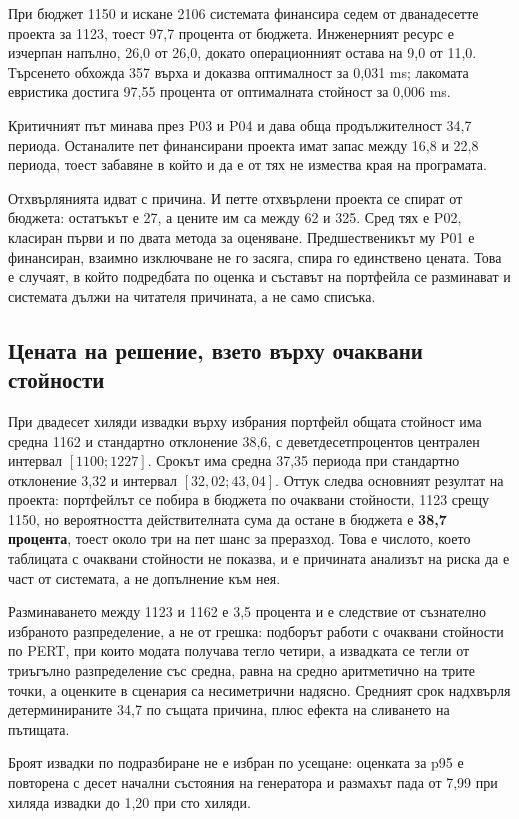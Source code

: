 При бюджет 1150 и искане 2106 системата финансира седем от дванадесетте проекта
за 1123, тоест 97,7 процента от бюджета. Инженерният ресурс е изчерпан напълно,
26,0 от 26,0, докато операционният остава на 9,0 от 11,0. Търсенето обхожда 357
върха и доказва оптималност за 0,031 ms; лакомата евристика достига 97,55 процента
от оптималната стойност за 0,006 ms.

Критичният път минава през P03 и P04 и дава обща продължителност 34,7 периода.
Останалите пет финансирани проекта имат запас между 16,8 и 22,8 периода, тоест
забавяне в който и да е от тях не измества края на програмата.

Отхвърлянията идват с причина. И петте отхвърлени проекта се спират от бюджета:
остатъкът е 27, а цените им са между 62 и 325. Сред тях е P02, класиран първи и
по двата метода за оценяване. Предшественикът му P01 е финансиран, взаимно
изключване не го засяга, спира го единствено цената. Това е случаят, в който
подредбата по оценка и съставът на портфейла се разминават и системата дължи на
читателя причината, а не само списъка.

\subsection{Цената на решение, взето върху очаквани стойности}

При двадесет хиляди извадки върху избрания портфейл общата стойност има средна
1162 и стандартно отклонение 38,6, с деветдесетпроцентов централен интервал
$[1100; 1227]$. Срокът има средна 37,35 периода при стандартно отклонение 3,32 и
интервал $[32{,}02; 43{,}04]$. Оттук следва основният резултат на проекта:
портфейлът се побира в бюджета по очаквани стойности, 1123 срещу 1150, но
вероятността действителната сума да остане в бюджета е \textbf{38,7 процента},
тоест около три на пет шанс за преразход. Това е числото, което таблицата с
очаквани стойности не показва, и е причината анализът на риска да е част от
системата, а не допълнение към нея.

Разминаването между 1123 и 1162 е 3,5 процента и е следствие от съзнателно
избраното разпределение, а не от грешка: подборът работи с очаквани стойности по
PERT, при които модата получава тегло четири, а извадката се тегли от триъгълно
разпределение със средна, равна на средно аритметично на трите точки, а оценките
в сценария са несиметрични надясно. Средният срок надхвърля детерминираните 34,7
по същата причина, плюс ефекта на сливането на пътищата.

Броят извадки по подразбиране не е избран по усещане: оценката за p95 е повторена
с десет начални състояния на генератора и размахът пада от 7,99 при хиляда
извадки до 1,20 при сто хиляди.

